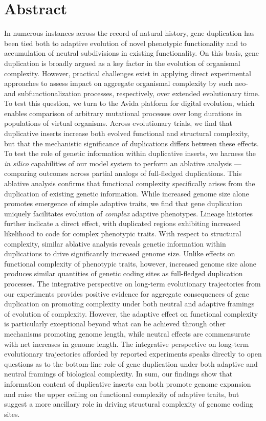 \section*{Abstract}

In numerous instances across the record of natural history, gene duplication has been tied both to adaptive evolution of novel phenotypic functionality and to accumulation of neutral subdivisions in existing functionality.
On this basis, gene duplication is broadly argued as a key factor in the evolution of organismal complexity.
However, practical challenges exist in applying direct experimental approaches to assess impact on aggregate organismal complexity by such neo- and subfunctionalization processes, respectively, over extended evolutionary time.
To test this question, we turn to the Avida platform for digital evolution, which enables comparison of arbitrary mutational processes over long durations in populations of virtual organisms.
Across evolutionary trials, we find that duplicative inserts increase both evolved functional and structural complexity, but that the mechanistic significance of duplications differs between these effects.
To test the role of genetic information within duplicative inserts, we harness the \textit{in silico} capabilities of our model system to perform an ablative analysis --- comparing outcomes across partial analogs of full-fledged duplications.
This ablative analysis confirms that functional complexity specifically arises from the duplication of existing genetic information.
While increased genome size alone promotes emergence of simple adaptive traits, we find that gene duplication uniquely facilitates evolution of \textit{complex} adaptive phenotypes.
Lineage histories further indicate a direct effect, with duplicated regions exhibiting increased likelihood to code for complex phenotypic traits.
With respect to structural complexity, similar ablative analysis reveals genetic information within duplications to drive significantly increased genome size.
Unlike effects on functional complexity of phenotypic traits, however, increased genome size alone produces similar quantities of genetic coding sites as full-fledged duplication processes.
The integrative perspective on long-term evolutionary trajectories from our experiments provides positive evidence for aggregate consequences of gene duplication on promoting complexity under both neutral and adaptive framings of evolution of complexity.
However, the adaptive effect on functional complexity is particularly exceptional beyond what can be achieved through other mechanisms promoting genome length, while neutral effects are commensurate with net increases in genome length.
The integrative perspective on long-term evolutionary trajectories afforded by reported experiments speaks directly to open questions as to the bottom-line role of gene duplication under both adaptive and neutral framings of biological complexity.
In sum, our findings show that information content of duplicative inserts can both promote genome expansion and raise the upper ceiling on functional complexity of adaptive traits, but suggest a more ancillary role in driving structural complexity of genome coding sites.
